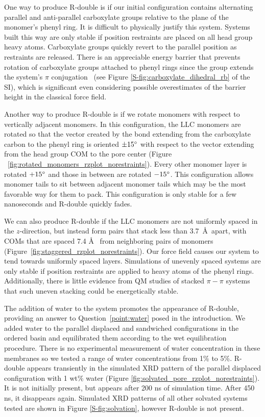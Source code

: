\documentclass[journal=jpcbfk,manuscript=article]{achemso}
\begin{document}
  One way to produce R-double is if our initial configuration contains
  alternating parallel and anti-parallel carboxylate groups relative to the plane
  of the monomer's phenyl ring.  It is difficult to physically justify this
  system. Systems built this way are only stable if position restraints are
  placed on all head group heavy atoms.  Carboxylate groups quickly revert to the
  parallel position as restraints are released. There is an appreciable energy
  barrier that prevents rotation of carboxylate groups attached to phenyl rings
  since the group extends the system's $\pi$ conjugation~\cite{carey_organic_2011} (see Figure
  \ref{S-fig:carboxylate_dihedral_rb} of the SI), which is significant even considering
  possible overestimates of the barrier height in the classical force field. 

  Another way to produce R-double is if we rotate monomers with respect to
  vertically adjacent monomers. In this configuration, the LLC monomers are rotated so
  that the vector created by the bond extending from the carboxylate carbon to
  the phenyl ring is oriented $\pm 15 \degree$ with respect to the vector
  extending from the head group COM to the pore center (Figure
  ~\ref{fig:rotated_monomers_rzplot_norestraints}). Every other monomer layer is
  rotated $+15 \degree$ and those in between are rotated $-15 \degree$. This
  configuration allows monomer tails to sit between adjacent monomer tails which
  may be the most favorable way for them to pack. This configuration is only
  stable for a few nanoseconds and R-double quickly fades.  
  
  We can also produce R-double if the LLC monomers are not uniformly spaced in the
  $z$-direction, but instead form pairs that stack less than 3.7~\AA~apart, with
  COMs that are spaced 7.4 \AA~ from neighboring pairs of monomers 
  (Figure~\ref{fig:staggered_rzplot_norestraints}). 
  Our force field causes our system to tend towards uniformly spaced layers.
  Simulations of unevenly spaced systems are only stable if position restraints
  are applied to heavy atoms of the phenyl rings.  Additionally, there is little
  evidence from QM studies of stacked $\pi-\pi$ systems that such uneven stacking
  could be energetically stable.~\cite{tauer_beyond_2005} 
  
  The addition of water to the system promotes the appearance of R-double, providing
  an answer to Question~\ref{point:water} posed in the introduction.
  We added water to the parallel displaced and sandwiched configurations in the
  ordered basin and equilibrated them according to the wet equilibration
  procedure. There is no experimental measurement of water concentration in these
  membranes so we tested a range of water concentrations from 1\% to 5\%.
  R-double appears transiently in the simulated XRD pattern of the parallel
  displaced configuration with 1 wt\% water (Figure
  \ref{fig:solvated_pore_rzplot_norestraints}). It is not initially present, but
  appears after 200 ns of simulation time. After 450 ns, it disappears again.
  Simulated XRD patterns of all other solvated systems tested are shown in Figure
  \ref{S-fig:solvation}, however R-double is not present.
\end{document}

